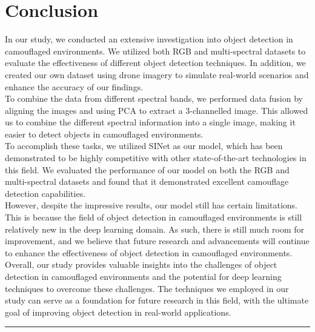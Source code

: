 \vspace{1cm}
\section{{{\fontsize{17}{21}\selectfont \textbf{Conclusion}}}}
\setlength{\columnsep}{1.5cm}

\begin{multicols}{2}
In our study, we conducted an extensive investigation into object detection in camouflaged environments. We utilized both RGB and multi-spectral datasets to evaluate the effectiveness of different object detection techniques. In addition, we created our own dataset using drone imagery to simulate real-world scenarios and enhance the accuracy of our findings.\\
To combine the data from different spectral bands, we performed data fusion by aligning the images and using PCA to extract a 3-channelled image. This allowed us to combine the different spectral information into a single image, making it easier to detect objects in camouflaged environments.\\
To accomplish these tasks, we utilized SINet as our model, which has been demonstrated to be highly competitive with other state-of-the-art technologies in this field. We evaluated the performance of our model on both the RGB and multi-spectral datasets and found that it demonstrated excellent camouflage detection capabilities.\\
However, despite the impressive results, our model still has certain limitations. This is because the field of object detection in camouflaged environments is still relatively new in the deep learning domain. As such, there is still much room for improvement, and we believe that future research and advancements will continue to enhance the effectiveness of object detection in camouflaged environments.\\
Overall, our study provides valuable insights into the challenges of object detection in camouflaged environments and the potential for deep learning techniques to overcome these challenges. The techniques we employed in our study can serve as a foundation for future research in this field, with the ultimate goal of improving object detection in real-world applications.
\end{multicols}

\vspace{0.5cm}
{\color{gray}\hrule}
\vspace{0.5cm}